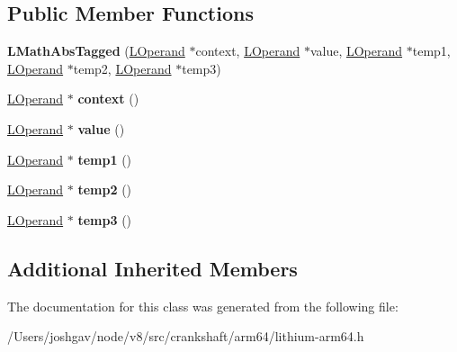 \subsection*{Public Member Functions}
\begin{DoxyCompactItemize}
\item 
{\bfseries L\+Math\+Abs\+Tagged} (\hyperlink{classv8_1_1internal_1_1_l_operand}{L\+Operand} $\ast$context, \hyperlink{classv8_1_1internal_1_1_l_operand}{L\+Operand} $\ast$value, \hyperlink{classv8_1_1internal_1_1_l_operand}{L\+Operand} $\ast$temp1, \hyperlink{classv8_1_1internal_1_1_l_operand}{L\+Operand} $\ast$temp2, \hyperlink{classv8_1_1internal_1_1_l_operand}{L\+Operand} $\ast$temp3)\hypertarget{classv8_1_1internal_1_1_l_math_abs_tagged_a60cdcacf68861cd9baa032772cda1c61}{}\label{classv8_1_1internal_1_1_l_math_abs_tagged_a60cdcacf68861cd9baa032772cda1c61}

\item 
\hyperlink{classv8_1_1internal_1_1_l_operand}{L\+Operand} $\ast$ {\bfseries context} ()\hypertarget{classv8_1_1internal_1_1_l_math_abs_tagged_a58ee63a74cee0ee0398716bfbc5783a9}{}\label{classv8_1_1internal_1_1_l_math_abs_tagged_a58ee63a74cee0ee0398716bfbc5783a9}

\item 
\hyperlink{classv8_1_1internal_1_1_l_operand}{L\+Operand} $\ast$ {\bfseries value} ()\hypertarget{classv8_1_1internal_1_1_l_math_abs_tagged_aeea4f63d8eff0cca957d22f190338636}{}\label{classv8_1_1internal_1_1_l_math_abs_tagged_aeea4f63d8eff0cca957d22f190338636}

\item 
\hyperlink{classv8_1_1internal_1_1_l_operand}{L\+Operand} $\ast$ {\bfseries temp1} ()\hypertarget{classv8_1_1internal_1_1_l_math_abs_tagged_a6d5beec5878e10c3299201812f1da25c}{}\label{classv8_1_1internal_1_1_l_math_abs_tagged_a6d5beec5878e10c3299201812f1da25c}

\item 
\hyperlink{classv8_1_1internal_1_1_l_operand}{L\+Operand} $\ast$ {\bfseries temp2} ()\hypertarget{classv8_1_1internal_1_1_l_math_abs_tagged_aa0db84dcc3842924d052a814752c035e}{}\label{classv8_1_1internal_1_1_l_math_abs_tagged_aa0db84dcc3842924d052a814752c035e}

\item 
\hyperlink{classv8_1_1internal_1_1_l_operand}{L\+Operand} $\ast$ {\bfseries temp3} ()\hypertarget{classv8_1_1internal_1_1_l_math_abs_tagged_af8a07b6c3f5a5063dc18fa5a1241eb4c}{}\label{classv8_1_1internal_1_1_l_math_abs_tagged_af8a07b6c3f5a5063dc18fa5a1241eb4c}

\end{DoxyCompactItemize}
\subsection*{Additional Inherited Members}


The documentation for this class was generated from the following file\+:\begin{DoxyCompactItemize}
\item 
/\+Users/joshgav/node/v8/src/crankshaft/arm64/lithium-\/arm64.\+h\end{DoxyCompactItemize}
